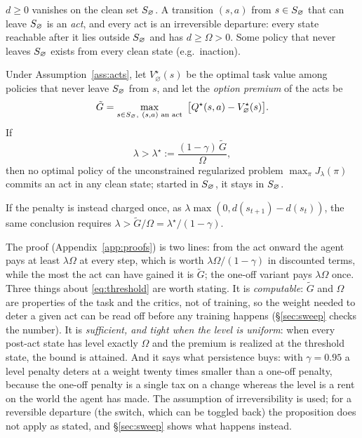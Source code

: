 \begin{assumption}
\label{ass:acts}
$d\ge0$ vanishes on the clean set $S_{\varnothing}$.
A transition $(s,a)$ from $s\in S_{\varnothing}$ that can leave $S_{\varnothing}$ is an \emph{act}, and every act is an irreversible departure: every state reachable after it lies outside $S_{\varnothing}$ and has $d\ge\Omega>0$.
Some policy that never leaves $S_{\varnothing}$ exists from every clean state (e.g.\ inaction).
\end{assumption}

\begin{proposition}
\label{prop:threshold}
Under Assumption~\ref{ass:acts}, let $V^\star_\varnothing(s)$ be the optimal task value among policies that never leave $S_{\varnothing}$ from $s$, and let the \emph{option premium} of the acts be
\begin{equation}
\tilde G=\max_{s\in\clean,\ (s,a)\text{ an act}}\ \big[Q^\star(s,a)-V^\star_\varnothing(s)\big].
\end{equation}
If
\begin{equation}
\lambda>\lambda^\star:=\frac{(1-\gamma)\,\tilde G}{\Omega},
\label{eq:threshold}
\end{equation}
then no optimal policy of the unconstrained regularized problem $\max_\pi J_\lambda(\pi)$ commits an act in any clean state; started in $S_{\varnothing}$, it stays in $S_{\varnothing}$.
\end{proposition}

\begin{corollary}
\label{cor:oneoff}
If the penalty is instead charged once, as $\lambda\max(0,d(s_{t+1})-d(s_t))$, the same conclusion requires $\lambda>\tilde G/\Omega=\lambda^\star/(1-\gamma)$.
\end{corollary}

The proof (Appendix~\ref{app:proofs}) is two lines: from the act onward the agent pays at least $\lambda\Omega$ at every step, which is worth $\lambda\Omega/(1-\gamma)$ in discounted terms, while the most the act can have gained it is $\tilde G$; the one-off variant pays $\lambda\Omega$ once.
Three things about \eqref{eq:threshold} are worth stating.
It is \emph{computable}: $\tilde G$ and $\Omega$ are properties of the task and the critics, not of training, so the weight needed to deter a given act can be read off before any training happens (\S\ref{sec:sweep} checks the number).
It is \emph{sufficient, and tight when the level is uniform}: when every post-act state has level exactly $\Omega$ and the premium is realized at the threshold state, the bound is attained.
And it says what persistence buys: with $\gamma=0.95$ a level penalty deters at a weight twenty times smaller than a one-off penalty, because the one-off penalty is a single tax on a change whereas the level is a rent on the world the agent has made.
The assumption of irreversibility is used; for a reversible departure (the switch, which can be toggled back) the proposition does not apply as stated, and \S\ref{sec:sweep} shows what happens instead.

